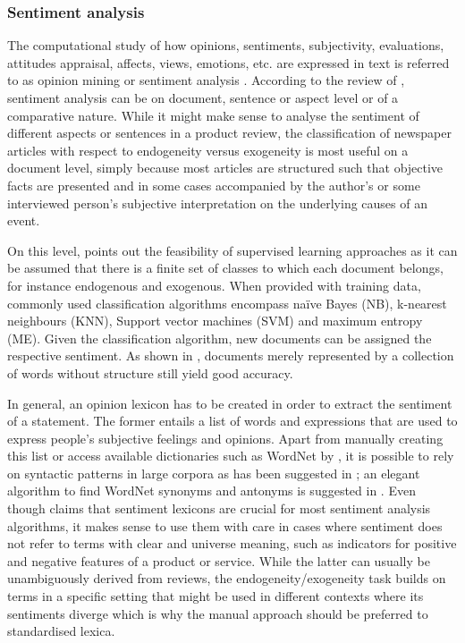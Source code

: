 %
\subsubsection{Sentiment analysis}

The computational study of how opinions, sentiments, subjectivity, evaluations, attitudes appraisal, affects, views, emotions, etc. are expressed in text is referred to as opinion mining or sentiment analysis \parencite{Liu.2012}. According to the review of \textcite{Feldman.2013}, sentiment analysis can be on document, sentence or aspect level or of a comparative nature. While it might make sense to analyse the sentiment of different aspects or sentences in a product review, the classification of newspaper articles with respect to endogeneity versus exogeneity is most useful on a document level, simply because most articles are structured such that objective facts are presented and in some cases accompanied by the author's or some interviewed person's subjective interpretation on the underlying causes of an event. 

On this level, \textcite{Feldman.2013} points out the feasibility of supervised learning approaches as it can be assumed that there is a finite set of classes to which each document belongs, for instance endogenous and exogenous. When provided with training data, commonly used classification algorithms encompass na\"{i}ve Bayes (NB), k-nearest neighbours (KNN), Support vector machines (SVM) and maximum entropy (ME). Given the classification algorithm, new documents can be assigned the respective sentiment. As shown in \textcite{Pang.2002}, documents merely represented by a collection of words without structure still yield good accuracy. 

In general, an opinion lexicon has to be created in order to extract the sentiment of a statement. The former entails a list of words and expressions that are used to express people's subjective feelings and opinions. Apart from manually creating this list or access available dictionaries such as WordNet\textsuperscript{\textregistered} by \textcite{Fellbaum.1998,Esuli.2006}, it is possible to rely on syntactic patterns in large corpora as has been suggested in \textcite{Ding.2008,Hatzivassiloglou.1997,Kanayama.2006,Turney.2002,Yu.2003}; an elegant algorithm to find WordNet\textsuperscript{\textregistered} synonyms and antonyms is suggested in \textcite{Kamps.2004}. Even though \textcite{Feldman.2013} claims that sentiment lexicons are crucial for most sentiment analysis algorithms, it makes sense to use them with care in cases where sentiment does not refer to terms with clear and universe meaning, such as indicators for positive and negative features of a product or service. While the latter can usually be unambiguously derived from reviews, the endogeneity/exogeneity task builds on terms in a specific setting that might be used in different contexts where its sentiments diverge which is why the manual approach should be preferred to standardised lexica. 

